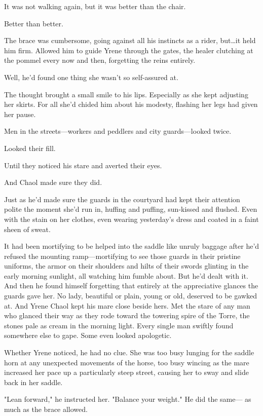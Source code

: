 It was not walking again, but it was better than the chair.

Better than better.

The brace was cumbersome, going against all his instincts as a rider, but\ldots it held him firm.
Allowed him to guide Yrene through the gates, the healer clutching at the pommel every now and then, forgetting the reins entirely.

Well, he'd found one thing she wasn't so self-assured at.

The thought brought a small smile to his lips.
Especially as she kept adjusting her skirts.
For all she'd chided him about his modesty, flashing her legs had given her pause.

Men in the streets---workers and peddlers and city guards---looked twice.

Looked their fill.

Until they noticed his stare and averted their eyes.

And Chaol made sure they did.

Just as he'd made sure the guards in the courtyard had kept their attention polite the moment she'd run in, huffing and puffing, sun-kissed and flushed.
Even with the stain on her clothes, even wearing yesterday's dress and coated in a faint sheen of sweat.

It had been mortifying to be helped into the saddle like unruly baggage after he'd refused the mounting ramp---mortifying to see those guards in their pristine uniforms, the armor on their shoulders and hilts of their swords glinting in the early morning sunlight, all watching him fumble about.
But he'd dealt with it.
And then he found himself forgetting that entirely at the appreciative glances the guards gave her.
No lady, beautiful or plain, young or old, deserved to be gawked at.
And Yrene 
Chaol kept his mare close beside hers.
Met the stare of any man who glanced their way as they rode toward the towering spire of the Torre, the stones pale as cream in the morning light.
Every single man swiftly found somewhere else to gape.
Some even looked apologetic.

Whether Yrene noticed, he had no clue.
She was too busy lunging for the saddle horn at any unexpected movements of the horse, too busy wincing as the mare increased her pace up a particularly steep street, causing her to sway and slide back in her saddle.

"Lean forward," he instructed her.
"Balance your weight."
He did the same--- as much as the brace allowed.

